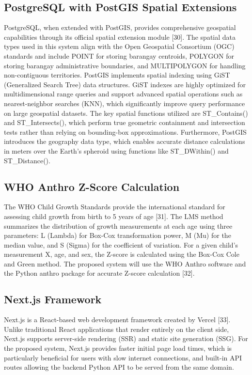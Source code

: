 \documentclass[12pt, a4paper]{report}
\begin{document}
\subsection{PostgreSQL with PostGIS Spatial Extensions}
\label{subsec:postgresql}
PostgreSQL, when extended with PostGIS, provides comprehensive geospatial capabilities through its official spatial extension module [30]. The spatial data types used in this system align with the Open Geospatial Consortium (OGC) standards and include POINT for storing barangay centroids, POLYGON for storing barangay administrative boundaries, and MULTIPOLYGON for handling non-contiguous territories. PostGIS implements spatial indexing using GiST (Generalized Search Tree) data structures. GiST indexes are highly optimized for multidimensional range queries and support advanced spatial operations such as nearest-neighbor searches (KNN), which significantly improve query performance on large geospatial datasets. The key spatial functions utilized are ST\_Contains() and ST\_Intersects(), which perform true geometric containment and intersection tests rather than relying on bounding-box approximations. Furthermore, PostGIS introduces the geography data type, which enables accurate distance calculations in meters over the Earth's spheroid using functions like ST\_DWithin() and ST\_Distance().

\subsection{WHO Anthro Z-Score Calculation}
\label{subsec:anthro}
The WHO Child Growth Standards provide the international standard for assessing child growth from birth to 5 years of age [31]. The LMS method summarizes the distribution of growth measurements at each age using three parameters: L (Lambda) for Box-Cox transformation power, M (Mu) for the median value, and S (Sigma) for the coefficient of variation. For a given child's measurement X, age, and sex, the Z-score is calculated using the Box-Cox Cole and Green method. The proposed system will use the WHO Anthro software and the Python anthro package for accurate Z-score calculation [32].

\subsection{Next.js Framework}
\label{subsec:nextjs}
Next.js is a React-based web development framework created by Vercel [33]. Unlike traditional React applications that render entirely on the client side, Next.js supports server-side rendering (SSR) and static site generation (SSG). For the proposed system, Next.js provides faster initial page load times, which is particularly beneficial for users with slow internet connections, and built-in API routes allowing the backend Python API to be served from the same domain.
\end{document}
